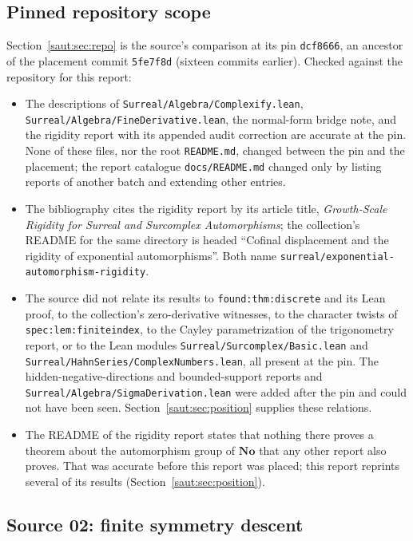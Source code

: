 \documentclass[11pt]{article}
\theoremstyle{definition}
\theoremstyle{remark}
\newcommand{\No}{\mathbf{No}}
\newcommand{\repo}[1]{\nolinkurl{#1}}%
\newcommand{\lbl}[1]{\nolinkurl{#1}}%
\numberwithin{equation}{section}
\begin{document}
\subsection{Pinned repository scope}\label{saut:app:pinned}

Section~\ref{saut:sec:repo} is the source's comparison at its pin
\texttt{dcf8666}, an ancestor of the placement commit \texttt{5fe7f8d}
(sixteen commits earlier). Checked against the repository for this report:
\begin{itemize}
\item The descriptions of \nolinkurl{Surreal/Algebra/Complexify.lean},
\nolinkurl{Surreal/Algebra/FineDerivative.lean}, the normal-form bridge note,
and the rigidity report with its appended audit correction are accurate at
the pin. None of these files, nor the root \texttt{README.md}, changed
between the pin and the placement; the report catalogue
\nolinkurl{docs/README.md} changed only by listing reports of another batch
and extending other entries.
\item The bibliography cites the rigidity report by its article title,
\emph{Growth-Scale Rigidity for Surreal and Surcomplex Automorphisms}; the
collection's README for the same directory is headed ``Cofinal displacement
and the rigidity of exponential automorphisms''. Both name
\repo{surreal/exponential-automorphism-rigidity}.
\item The source did not relate its results to
\lbl{found:thm:discrete} and its Lean proof, to the collection's
zero-derivative witnesses, to the character twists of
\lbl{spec:lem:finiteindex}, to the Cayley parametrization of the
trigonometry report, or to the Lean modules
\nolinkurl{Surreal/Surcomplex/Basic.lean} and
\nolinkurl{Surreal/HahnSeries/ComplexNumbers.lean}, all present at the pin.
The hidden-negative-directions and bounded-support reports and
\nolinkurl{Surreal/Algebra/SigmaDerivation.lean} were added after the pin
and could not have been seen. Section~\ref{saut:sec:position} supplies
these relations.
\item The README of the rigidity report states that nothing there
proves a theorem about the automorphism group of $\No$ that any other
report also proves. That was accurate before this report was placed; this report
reprints several of its results (Section~\ref{saut:sec:position}).
\end{itemize}

\subsection{Source 02: finite symmetry descent}\label{saut:app:source02}
\end{document}
